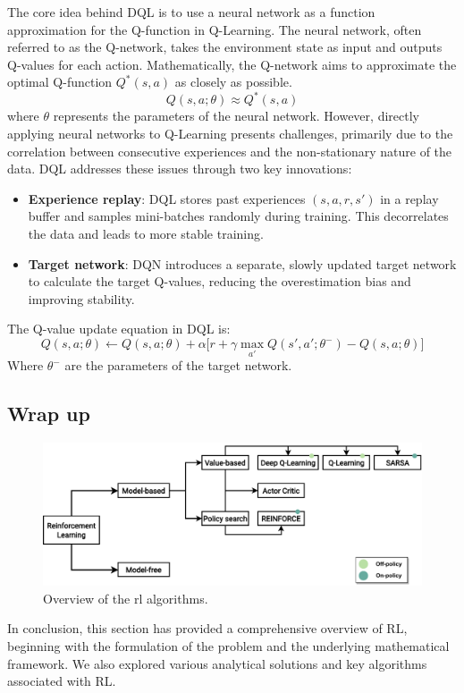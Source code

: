  The core idea behind DQL is to use a neural network as a function approximation for the Q-function in Q-Learning. 
  The neural network, often referred to as the Q-network, 
  takes the environment state as input and outputs Q-values for each action.
%  
Mathematically, the Q-network aims to approximate the optimal Q-function \(Q^*(s, a)\) 
 as closely as possible.
\begin{equation}
Q(s, a; \theta) \approx Q^*(s, a)
\end{equation}
where \(\theta\) represents the parameters of the neural network.
%
However, directly applying neural networks to Q-Learning presents challenges, 
 primarily due to the correlation between consecutive experiences and the non-stationary nature of the data. 
 DQL addresses these issues through two key innovations:
\begin{itemize}
  \item \textbf{Experience replay}: DQL stores past experiences \((s, a, r, s')\) in a replay buffer and samples mini-batches randomly during training. 
  This decorrelates the data and leads to more stable training.
  \item \textbf{Target network}: DQN introduces a separate, 
  slowly updated target network to calculate the target Q-values, 
  reducing the overestimation bias and improving stability.
\end{itemize}
The Q-value update equation in DQL is:
\begin{equation}
Q(s, a; \theta) \leftarrow Q(s, a; \theta) + \alpha \Big[ r + \gamma \max_{a'} Q(s', a'; \theta^-) - Q(s, a; \theta) \Big]
\end{equation}
Where \(\theta^-\) are the parameters of the target network.
\subsection{Wrap up}
\begin{figure}
  \includegraphics[width=\textwidth]{chapters/img/rl-overview.drawio.pdf}
  \caption{Overview of the \ac{rl} algorithms.}\label{fig:rl:overview}
\end{figure}
In conclusion, 
 this section has provided a comprehensive overview of RL, 
 beginning with the formulation of the problem and the underlying mathematical framework. 
 We also explored various analytical solutions and key algorithms associated with RL. 


